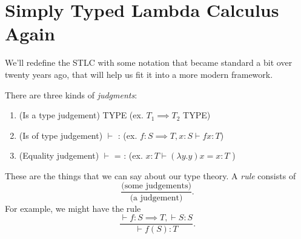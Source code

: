 \documentclass{article}
\newcommand{\yields}{\vdash}
\newcommand\blank{ \underline{\phantom{$\quad\quad$}} }
\begin{document}
\section{Simply Typed Lambda Calculus Again}

We'll redefine the STLC with some notation that became standard
a bit over twenty years ago, that will help us fit it into a 
more modern framework.

There are three kinds of \emph{judgments}:
\begin{enumerate}
    \item (Is a type judgement) \underline{\phantom{$\quad\quad$}} TYPE 
        (ex. $T_1\implies T_2$ TYPE)
    \item (Is of type judgement) \blank $\yields$ \blank : \blank (ex. 
        $f:S\implies T, x :S \yields fx : T$)
    \item (Equality judgement) \blank $\yields$ \blank = \blank : \blank (ex.
        $x:T \yields (\lambda y.y)x = x : T$ )
\end{enumerate}

These are the things that we can say about our type theory.
A \emph{rule} consists of 
\[ \frac{\text{(some judgements)}}{\text{(a judgement)}}. \]
For example, we might have the rule
\[ \frac{\yields f:S\implies T, \yields S: S}{\yields f(S):T}.\]
\end{document}
